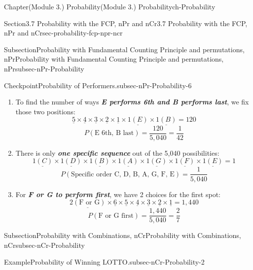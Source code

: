 \documentclass[oneside,10pt,]{book}
\newcommand{\alert}[1]{\textbf{\textit{#1}}}
\begin{document}
\begin{chapterptx}{Chapter}{(Module 3.) Probability}{}{(Module 3.) Probability}{}{}{ch-Probability}
\begin{sectionptx}{Section}{3.7 Probability with the FCP, nPr and nCr}{}{3.7 Probability with the FCP, nPr and nCr}{}{}{sec-probability-fcp-npr-ncr}
\begin{subsectionptx}{Subsection}{Probability with Fundamental Counting Principle and permutations, nPr}{}{Probability with Fundamental Counting Principle and permutations, nPr}{}{}{subsec-nPr-Probability}
\begin{inlineexercise}{Checkpoint}{Probability of Performers.}{subsec-nPr-Probability-6}
\begin{enumerate}[label={\alph*}]
\begin{equation*}
\end{equation*}
%
\begin{equation*}
P(\text{D first}) = \frac{720}{5,040} = \frac{1}{7}
\end{equation*}
%
\item{}To find the number of ways \alert{E performs 6th and B performs last}, we fix those two positions:%
\begin{equation*}
\underline{5} \times \underline{4} \times \underline{3} \times \underline{2} \times \underline{1} \times \underline{1 (E)} \times \underline{1 (B)} = 120
\end{equation*}
%
\begin{equation*}
P(\text{E 6th, B last}) = \frac{120}{5,040} = \frac{1}{42}
\end{equation*}
%
\item{}There is only \alert{one specific sequence} out of the 5,040 possibilities:%
\begin{equation*}
\underline{1 (C)} \times \underline{1 (D)} \times \underline{1 (B)} \times \underline{1 (A)} \times \underline{1 (G)} \times \underline{1 (F)} \times \underline{1 (E)} = 1
\end{equation*}
%
\begin{equation*}
P(\text{Specific order C, D, B, A, G, F, E}) = \frac{1}{5,040}
\end{equation*}
%
\item{}For \alert{F or G to perform first}, we have 2 choices for the first spot:%
\begin{equation*}
\underline{2 (\text{F or G})} \times \underline{6} \times \underline{5} \times \underline{4} \times \underline{3} \times \underline{2} \times \underline{1} = 1{,}440
\end{equation*}
%
\begin{equation*}
P(\text{F or G first}) = \frac{1,440}{5,040} = \frac{2}{7}
\end{equation*}
%
\end{enumerate}
%
\end{inlineexercise}%
\end{subsectionptx}
%
%
\typeout{************************************************}
\typeout{************************************************}
%
\begin{subsectionptx}{Subsection}{Probability with Combinations, nCr}{}{Probability with Combinations, nCr}{}{}{subsec-nCr-Probability}
\begin{example}{Example}{Probability of Winning LOTTO.}{subsec-nCr-Probability-2}%

\end{example}
\end{subsectionptx}
\end{sectionptx}
\end{chapterptx}
\end{document}
